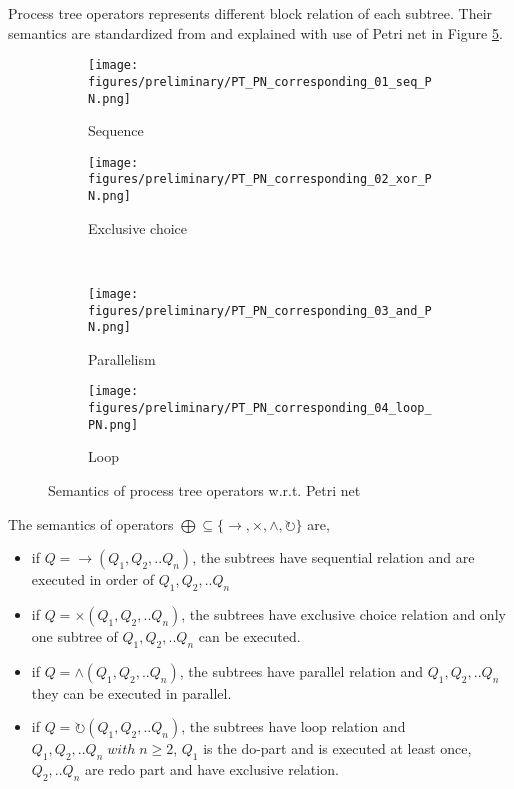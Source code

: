 Process tree operators represents different block relation of each subtree. Their semantics are standardized from \cite{vanderAalst:2016:PMD:2948762, Buijs2012OnTR} and explained with use of Petri net in Figure \ref{fig:pn_pt_correspondings}\cite{Buijs2012OnTR}.
\begin{figure}[!h]
	\centering
	\begin{subfigure}[b]{0.45\textwidth}
		\centering
		\texttt{[image: figures/preliminary/PT\_PN\_corresponding\_01\_seq\_PN.png]}
		\caption{Sequence}
		\label{fig:pt_pn_seq}
	\end{subfigure}%
	\quad
	\begin{subfigure}[b]{0.45\textwidth}
		\centering
		\texttt{[image: figures/preliminary/PT\_PN\_corresponding\_02\_xor\_PN.png]}
		\caption{Exclusive choice}
		\label{fig:pt_pn_xor}
	\end{subfigure}%
	\\ %
	\begin{subfigure}[b]{0.45\textwidth}
		\centering
		\texttt{[image: figures/preliminary/PT\_PN\_corresponding\_03\_and\_PN.png]}
		\caption{ Parallelism }
		\label{fig:pt_pn_and}
	\end{subfigure}%
	\quad
	\begin{subfigure}[b]{0.45\textwidth}
		\centering
		\texttt{[image: figures/preliminary/PT\_PN\_corresponding\_04\_loop\_PN.png]}
		\caption{Loop}
		\label{fig:pt_pn_loop}
	\end{subfigure}%
	\caption{Semantics of process tree operators w.r.t. Petri net}
	\label{fig:pn_pt_correspondings}
\end{figure}
\begin{definition} 
	The semantics of operators $\bigoplus \subseteq \{\rightarrow, \times, \land, \circlearrowright \}$ are,
	\begin{itemize}
		\item if $Q= \rightarrow(Q_1 , Q_2 ,.. Q_n)$, the subtrees have sequential relation and are executed in order of $Q_1,Q_2,..Q_n$
		\item if $Q= \times(Q_1 , Q_2 ,.. Q_n)$,  the subtrees have exclusive choice relation and only one subtree of $Q_1,Q_2,..Q_n$   can be executed.
		\item if $Q= \land (Q_1 , Q_2 ,.. Q_n)$,  the subtrees have parallel relation and $Q_1,Q_2,..Q_n$ they can be executed in parallel.
		\item if $Q= \circlearrowright(Q_1 , Q_2 ,.. Q_n)$,  the subtrees have loop relation and $Q_1,Q_2,..Q_n \; with\; n\geq2$, $Q_1$ is the do-part and is executed at least once, $Q_2,..Q_n$ are redo part and have exclusive relation.
	\end{itemize}
\end{definition}

